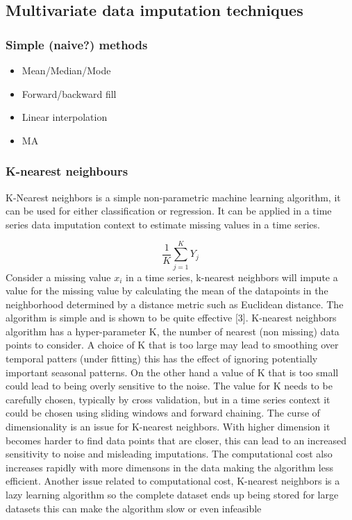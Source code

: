 \documentclass[
]{report}
\begin{document}

\subsection{Multivariate data imputation
techniques}\label{multivariate-data-imputation-techniques}

\subsubsection{Simple (naive?) methods}\label{simple-naive-methods}

\begin{itemize}
\item Mean/Median/Mode
\item Forward/backward fill
\item Linear interpolation
\item MA
\end{itemize}

\subsubsection{K-nearest neighbours}\label{k-nearest-neighbours}

K-Nearest neighbors is a simple non-parametric machine learning
algorithm, it can be used for either classification or regression. It
can be applied in a time series data imputation context to estimate
missing values in a time series.

\[\frac{1}{K}\sum_{j=1}^K Y_j\] Consider a missing value \(x_i\) in a
time series, k-nearest neighbors will impute a value for the missing
value by calculating the mean of the datapoints in the neighborhood
determined by a distance metric such as Euclidean distance. The
algorithm is simple and is shown to be quite effective {[}3{]}.
K-nearest neighbors algorithm has a hyper-parameter K, the number of
nearest (non missing) data points to consider. A choice of K that is too
large may lead to smoothing over temporal patters (under fitting) this
has the effect of ignoring potentially important seasonal patterns. On
the other hand a value of K that is too small could lead to being overly
sensitive to the noise. The value for K needs to be carefully chosen,
typically by cross validation, but in a time series context it could be
chosen using sliding windows and forward chaining. The curse of
dimensionality is an issue for K-nearest neighbors. With higher
dimension it becomes harder to find data points that are closer, this
can lead to an increased sensitivity to noise and misleading
imputations. The computational cost also increases rapidly with more
dimensons in the data making the algorithm less efficient. Another issue
related to computational cost, K-nearest neighbors is a lazy learning
algorithm so the complete dataset ends up being stored for large
datasets this can make the algorithm slow or even infeasible
\end{document}
